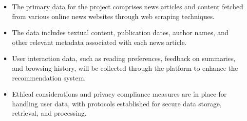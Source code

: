 \documentclass[a4paper]{article}
\begin{document}
\begin{itemize}
    \item The primary data for the project comprises news articles and content fetched from various online news websites through web scraping techniques.
    \item The data includes textual content, publication dates, author names, and other relevant metadata associated with each news article.
    \item User interaction data, such as reading preferences, feedback on summaries, and browsing history, will be collected through the platform to enhance the recommendation system.
    \item Ethical considerations and privacy compliance measures are in place for handling user data, with protocols established for secure data storage, retrieval, and processing.
\end{itemize}
\end{document}
